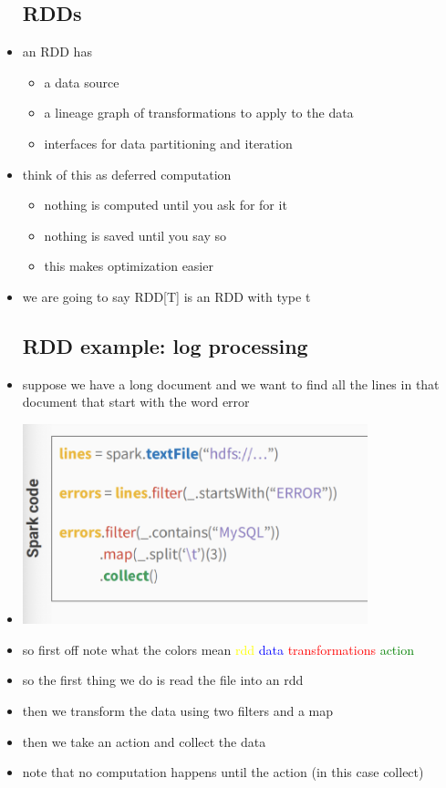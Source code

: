 \documentclass{article}
\begin{document}
\begin{itemize}
\subsection*{RDDs}
\item an RDD has
\begin{itemize}
    \item a data source 
    \item a lineage graph of transformations to apply to the data 
    \item interfaces for data partitioning and iteration
\end{itemize}
\item think of this as deferred computation
\begin{itemize}
    \item nothing is computed until you ask for for it 
    \item nothing is saved until you say so 
    \item this makes optimization easier
\end{itemize}
\item we are going to say RDD[T] is an RDD with type t 
\subsection*{RDD example: log processing}
\item suppose we have a long document and we want to find all the lines in that document that start with the word error 
\item \includegraphics*[width=10cm]{images/Screenshot 2023-05-10 at 1.19.52 AM.png}
\item so first off note what the colors mean \textcolor{yellow}{rdd} \textcolor{blue}{data} \textcolor{red}{transformations} \textcolor{green}{action}
\item so the first thing we do is read the file into an rdd 
\item then we transform the data using two filters and a map 
\item then we take an action and collect the data
\item note that no computation happens until the action (in this case collect)

\end{itemize}
\end{document}
